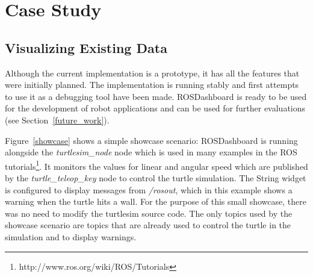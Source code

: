 \chapter{Case Study}


\section{Visualizing Existing Data}
Although the current implementation is a prototype, it has all the features that were initially planned. The implementation is running stably and first attempts to use it as a debugging tool have been made. ROSDashboard is ready to be used for the development of robot applications and can be used for further evaluations (see Section~\ref{future_work}).

Figure~\ref{showcase} shows a simple showcase scenario: ROSDashboard is running alongside the \emph{turtlesim\_node} node which is used in many examples in the ROS tutorials\footnote{http://www.ros.org/wiki/ROS/Tutorials}. It monitors the values for linear and angular speed which are published by the \emph{turtle\_teleop\_key} node to control the turtle simulation. The String widget is configured to display messages from \emph{/rosout}, which in this example shows a warning when the turtle hits a wall.
For the purpose of this small showcase, there was no need to modify the turtlesim source code. The only topics used by the showcase scenario are topics that are already used to control the turtle in the simulation and to display warnings.

